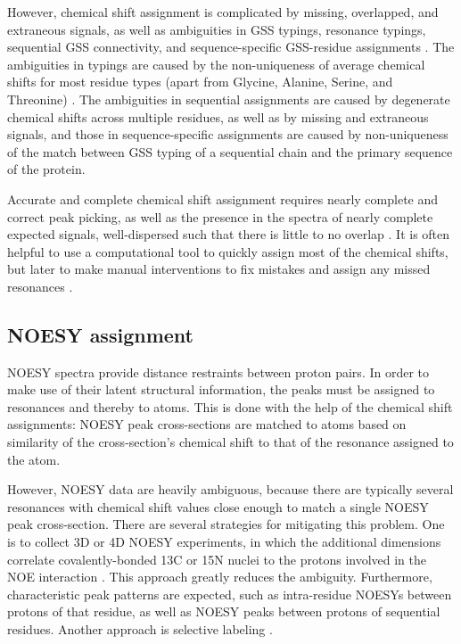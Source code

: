 However, chemical shift assignment is complicated by missing, overlapped, and
extraneous signals, as well as ambiguities in GSS typings, resonance typings,
sequential GSS connectivity, and sequence-specific GSS-residue assignments
\cite{williamson2009automated, guerry2011automated}.
The ambiguities in typings are caused by the non-uniqueness of average chemical
shifts for most residue types (apart from Glycine, Alanine, Serine, and 
Threonine) \cite{bmrb}.  The ambiguities in sequential
assignments are caused by degenerate chemical shifts across multiple residues,
as well as by missing and extraneous signals, and those in sequence-specific
assignments are caused by non-uniqueness of the match between GSS typing
of a sequential chain and the primary sequence of the protein.

Accurate and complete chemical shift assignment requires nearly complete and
correct peak picking, as well as the presence in the spectra of nearly complete
expected signals, well-dispersed such that there is little to no overlap
\cite{guntert2009automated, guerry2011automated}.
It is often helpful to use a computational tool to quickly assign most of the
chemical shifts, but later to make manual interventions to fix mistakes and
assign any missed resonances \cite{baran2004automated}.

\subsection*{NOESY assignment}

NOESY spectra provide distance restraints between proton pairs.  In order to
make use of their latent structural information, the peaks must be assigned
to resonances and thereby to atoms.  This is done with the help of the 
chemical shift assignments: NOESY peak cross-sections are matched to atoms
based on similarity of the cross-section's chemical shift to that of the
resonance assigned to the atom.

However, NOESY data are heavily ambiguous, because there are typically several
resonances with chemical shift values close enough to match a single NOESY
peak cross-section.  There are several strategies for mitigating this problem.
One is to collect 3D or 4D NOESY experiments, in which the additional dimensions
correlate covalently-bonded 13C or 15N nuclei to the protons involved in the
NOE interaction \cite{majumdar1993improved}.  
This approach greatly reduces the ambiguity.  Furthermore,
characteristic peak patterns are expected, such as intra-residue NOESYs between
protons of that residue, as well as NOESY peaks between protons of sequential
residues.  Another approach is selective labeling \cite{takeda2007automated}.

